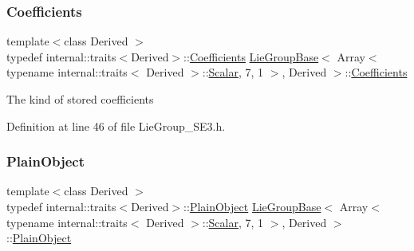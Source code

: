 \subsubsection{\texorpdfstring{Coefficients}{Coefficients}}
{\footnotesize\ttfamily template$<$class Derived $>$ \\
typedef internal\+::traits$<$Derived$>$\+::\hyperlink{class_lie_group_base_3_01_array_3_01typename_01internal_1_1traits_3_01_derived_01_4_1_1_scalar_0d6d4b5459662fc32c7117aee50362fb1_a51943ca22e0a551b6d1d82e11ee073fe}{Coefficients} \hyperlink{class_lie_group_base}{Lie\+Group\+Base}$<$ Array$<$ typename internal\+::traits$<$ Derived $>$\+::\hyperlink{class_lie_group_base_3_01_array_3_01typename_01internal_1_1traits_3_01_derived_01_4_1_1_scalar_0d6d4b5459662fc32c7117aee50362fb1_a831695c575380c9a1df32eff9fc4a8c6}{Scalar}, 7, 1 $>$, Derived $>$\+::\hyperlink{class_lie_group_base_3_01_array_3_01typename_01internal_1_1traits_3_01_derived_01_4_1_1_scalar_0d6d4b5459662fc32c7117aee50362fb1_a51943ca22e0a551b6d1d82e11ee073fe}{Coefficients}}

The kind of stored coefficients 

Definition at line 46 of file Lie\+Group\+\_\+\+S\+E3.\+h.

\hypertarget{class_lie_group_base_3_01_array_3_01typename_01internal_1_1traits_3_01_derived_01_4_1_1_scalar_0d6d4b5459662fc32c7117aee50362fb1_a950a48c9e027bcd00193aa20a59ee723}{}\label{class_lie_group_base_3_01_array_3_01typename_01internal_1_1traits_3_01_derived_01_4_1_1_scalar_0d6d4b5459662fc32c7117aee50362fb1_a950a48c9e027bcd00193aa20a59ee723} 
\subsubsection{\texorpdfstring{Plain\+Object}{PlainObject}}
{\footnotesize\ttfamily template$<$class Derived $>$ \\
typedef internal\+::traits$<$Derived$>$\+::\hyperlink{class_lie_group_base_3_01_array_3_01typename_01internal_1_1traits_3_01_derived_01_4_1_1_scalar_0d6d4b5459662fc32c7117aee50362fb1_a950a48c9e027bcd00193aa20a59ee723}{Plain\+Object} \hyperlink{class_lie_group_base}{Lie\+Group\+Base}$<$ Array$<$ typename internal\+::traits$<$ Derived $>$\+::\hyperlink{class_lie_group_base_3_01_array_3_01typename_01internal_1_1traits_3_01_derived_01_4_1_1_scalar_0d6d4b5459662fc32c7117aee50362fb1_a831695c575380c9a1df32eff9fc4a8c6}{Scalar}, 7, 1 $>$, Derived $>$\+::\hyperlink{class_lie_group_base_3_01_array_3_01typename_01internal_1_1traits_3_01_derived_01_4_1_1_scalar_0d6d4b5459662fc32c7117aee50362fb1_a950a48c9e027bcd00193aa20a59ee723}{Plain\+Object}}

